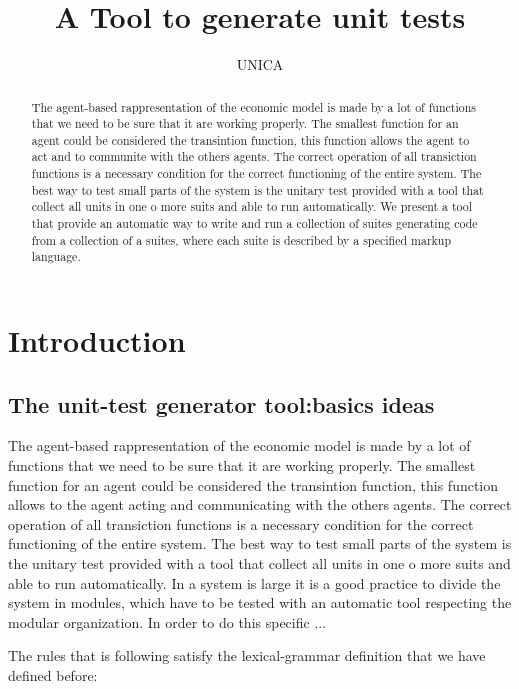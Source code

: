 \documentclass[a4paper,10pt]{article}
\title{A Tool to generate unit tests }
\author{UNICA}
\begin{document}
\maketitle



\begin{abstract} 
The agent-based rappresentation of the economic model is made by a lot of functions that we need to be sure that it are working properly. The smallest function for an agent could be considered the transintion function, this function allows the agent to act and to communite with the others agents. The correct operation of all transiction functions  is a necessary condition for the correct functioning of the entire system.
The best way to test small parts of the system is the unitary test provided with a tool that collect all units in one o more suits and able to run automatically. We present a tool that provide an automatic way to write and run a collection of suites generating code from a collection of a suites, where each suite is described by a specified markup language.
\end{abstract}
\tableofcontents

\section{Introduction}

\subsection{The unit-test generator tool:basics ideas}

The agent-based rappresentation of the economic model is made by a lot of functions that we need to be sure that it are working properly. The smallest function for an agent could be considered the transintion function, this function allows to the agent acting and communicating with the others agents. The correct operation of all transiction functions is a necessary condition for the correct functioning of the entire system.
The best way to test small parts of the system is the unitary test provided with a tool that collect all units in one o more suits and able to run automatically. In a system is large it is a good practice to divide the system in modules, which have to be tested with an automatic tool respecting the modular organization. In order to do this specific ... 

%
The rules that is following satisfy the lexical-grammar definition that we have defined before:

\end{document}
